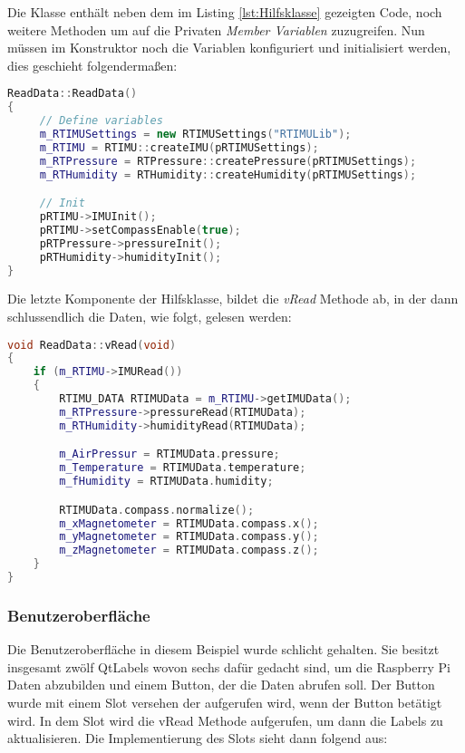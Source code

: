 Die Klasse enthält neben dem im Listing \ref{lst:Hilfsklasse} gezeigten Code, noch weitere
Methoden um auf die Privaten \emph{Member Variablen} zuzugreifen. Nun müssen im Konstruktor noch
die Variablen konfiguriert und initialisiert werden, dies geschieht folgendermaßen:

\begin{lstlisting}[language=C++, caption=RTIMU-Hilfsklasse-Konstruktor,
    label=lst:HilfsklasseKonstruktor]
ReadData::ReadData()
{
     // Define variables
     m_RTIMUSettings = new RTIMUSettings("RTIMULib");
     m_RTIMU = RTIMU::createIMU(pRTIMUSettings);
     m_RTPressure = RTPressure::createPressure(pRTIMUSettings);
     m_RTHumidity = RTHumidity::createHumidity(pRTIMUSettings);

     // Init
     pRTIMU->IMUInit();
     pRTIMU->setCompassEnable(true);
     pRTPressure->pressureInit();
     pRTHumidity->humidityInit();
}

\end{lstlisting}

Die letzte Komponente der Hilfsklasse, bildet die \emph{vRead} Methode ab, in der dann
schlussendlich die Daten, wie folgt, gelesen werden:

\begin{lstlisting}[language=C++, caption=RTIMU-Hilfsklasse-vRead,
    label=lst:vRead]
void ReadData::vRead(void)
{
    if (m_RTIMU->IMURead())
    {
        RTIMU_DATA RTIMUData = m_RTIMU->getIMUData();
        m_RTPressure->pressureRead(RTIMUData);
        m_RTHumidity->humidityRead(RTIMUData);

        m_AirPressur = RTIMUData.pressure;
        m_Temperature = RTIMUData.temperature;
        m_fHumidity = RTIMUData.humidity;

        RTIMUData.compass.normalize();
        m_xMagnetometer = RTIMUData.compass.x();
        m_yMagnetometer = RTIMUData.compass.y();
        m_zMagnetometer = RTIMUData.compass.z();
    }
}

\end{lstlisting}

\subsubsection{Benutzeroberfläche}
\label{subsubsec:QtGui}
Die Benutzeroberfläche in diesem Beispiel wurde schlicht gehalten. Sie besitzt insgesamt zwölf
QtLabels wovon sechs dafür gedacht sind, um die Raspberry Pi Daten abzubilden und einem Button,
der die Daten abrufen soll.
\newline
\newline
Der Button wurde mit einem Slot versehen der aufgerufen wird, wenn der Button betätigt wird. In
dem Slot wird die vRead Methode aufgerufen, um dann die Labels zu aktualisieren. Die
Implementierung des Slots sieht dann folgend aus:


